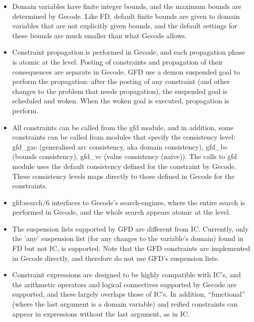 \begin{description}
\begin{itemize}
       \item Domain variables have finite integer bounds, and the maximum 
       bounds are
       determined by Gecode. Like FD, default finite bounds are given to 
       domain variables that are not explicitly given bounds, and the default
       settings for these bounds are much smaller than what Gecode allows.

       \item Constraint propagation is performed in Gecode, and each propagation
       phase is atomic at the \eclipse level. Posting of constraints and 
       propagation of their consequences are separate in Gecode. GFD use a
       demon suspended goal to perform the propagation: after the posting
       of any constraint (and other changes to the problem that needs 
       propagation), the suspended goal is scheduled and woken. When the
       woken goal is executed, propagation is perform. 

       \item All constraints can be called from the gfd module, and in
       addition, some constraints can be called from modules that specify
       the consistency level: gfd_gac (generalised arc consistency, aka
       domain consistency), gfd_bc (bounds consistency), gfd_vc (value
       consistency (naive)). The calls to gfd module uses the 
       default consistency 
       defined for the constraint by Gecode. These consistency levels maps 
       directly to those defined in Gecode for the constraints.

       \item gfd:search/6 interfaces to Gecode's search-engines, where the
       entire search is performed in Gecode, and the whole search appears
       atomic at the \eclipse level. 

       \item The suspension lists supported by GFD are different from IC.
       Currently, only the 'any' suspension list (for any changes to the
       variable's domain) found in FD but not IC, is supported. Note that
       the GFD constraints are implemented in Gecode directly, and therefore
       do not use GFD's suspension lists. 

      \item Constraint expressions are designed to be highly compatible with 
      IC's, and the arithmetic operators and logical connectives supported 
      by Gecode are supported, and these largely overlaps those of IC's.
      In addition, ``functional'' (where the last argument is a domain 
      variable) and reified constraints can appear in expressions without the
      last argument, as in IC.


\end{itemize}
\end{description}
